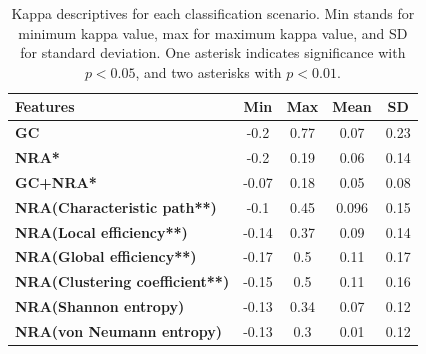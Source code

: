 \begin{table}[ht]
\caption{Kappa descriptives for each classification scenario. Min stands for minimum kappa value, max for maximum kappa value, and SD for standard deviation. One asterisk indicates significance with $p<0.05$, and two asterisks with $p<0.01$.}\label{Table1}
\centering %
{\begin{tabular}{|l|c|c|c|c|}
\hline
\toprule
 \textbf{Features} & \textbf{Min} & \textbf{Max} & \textbf{Mean} & \textbf{SD} \\
\hline
\toprule
\textbf{GC} & -0.2 & 0.77 & 0.07 & 0.23 \\
\hline
\toprule
 \textbf{NRA*} & -0.2 & 0.19 & 0.06 & 0.14 \\
\hline
\toprule
\textbf{GC+NRA*} & -0.07 & 0.18 & 0.05 & 0.08  \\
\hline
\toprule
\textbf{NRA(Characteristic path**)} & -0.1 & 0.45 & 0.096 & 0.15 \\
\hline
\toprule
\textbf{NRA(Local efficiency**)} & -0.14 & 0.37 & 0.09 & 0.14 \\
\hline
\toprule
\textbf{NRA(Global efficiency**)} & -0.17 & 0.5 & 0.11 & 0.17 \\
\hline
\toprule
 \textbf{NRA(Clustering coefficient**)} & -0.15 & 0.5 & 0.11 & 0.16 \\
\hline
\toprule
\textbf{NRA(Shannon entropy)} & -0.13 & 0.34 & 0.07 & 0.12 \\
\hline
\toprule
\textbf{NRA(von Neumann entropy)} & -0.13 & 0.3 & 0.01 & 0.12 \\
\bottomrule
\end{tabular}}
\end{table}

